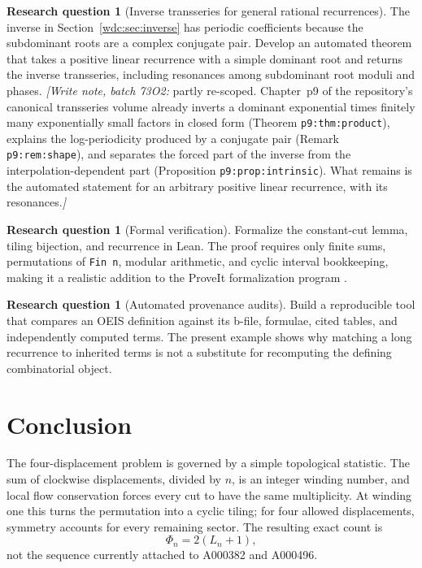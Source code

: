 \documentclass[11pt,letterpaper]{article}
\numberwithin{equation}{section}
\theoremstyle{definition}
\newtheorem{question}[theorem]{Research question}
\begin{document}
\begin{question}[Inverse transseries for general rational recurrences]
The inverse in Section~\ref{wdc:sec:inverse} has periodic coefficients because the
subdominant roots are a complex conjugate pair.  Develop an automated theorem
that takes a positive linear recurrence with a simple dominant root and
returns the inverse transseries, including resonances among subdominant root
moduli and phases.
\emph{[Write note, batch 73O2:} partly re-scoped. Chapter~p9 of the
repository's canonical transseries volume \cite{tai} already inverts a
dominant exponential times finitely many exponentially small factors in
closed form (Theorem \texttt{p9:thm:product}), explains the log-periodicity
produced by a conjugate pair (Remark \texttt{p9:rem:shape}), and separates
the forced part of the inverse from the interpolation-dependent part
(Proposition \texttt{p9:prop:intrinsic}). What remains is the automated
statement for an arbitrary positive linear recurrence, with its
resonances.\emph{]}
\end{question}

\begin{question}[Formal verification]
Formalize the constant-cut lemma, tiling bijection, and recurrence in Lean.
The proof requires only finite sums, permutations of \texttt{Fin n}, modular
arithmetic, and cyclic interval bookkeeping, making it a realistic addition to
the ProveIt formalization program \cite{proveit}.
\end{question}

\begin{question}[Automated provenance audits]
Build a reproducible tool that compares an OEIS definition against its b-file,
formulae, cited tables, and independently computed terms.  The present example
shows why matching a long recurrence to inherited terms is not a substitute
for recomputing the defining combinatorial object.
\end{question}

\section{Conclusion}

The four-displacement problem is governed by a simple topological statistic.
The sum of clockwise displacements, divided by $n$, is an integer winding
number, and local flow conservation forces every cut to have the same
multiplicity.  At winding one this turns the permutation into a cyclic tiling;
for four allowed displacements, symmetry accounts for every remaining sector.
The resulting exact count is
\[
  \Phi_n=2(L_n+1),
\]
not the sequence currently attached to A000382 and A000496.
\end{document}
